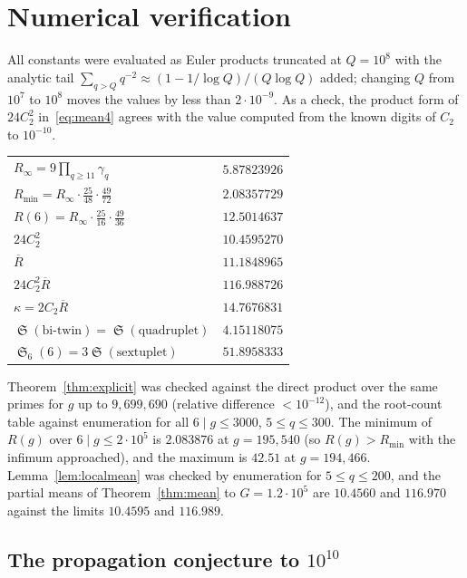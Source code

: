 \documentclass[11pt,a4paper]{article}
\theoremstyle{plain}
\theoremstyle{definition}
\theoremstyle{remark}
\newcommand{\Rbar}{\overline{R}}
\newcommand{\Rinf}{R_{\infty}}
\newcommand{\Rmin}{R_{\min}}
\DeclareMathOperator{\Sing}{\mathfrak S}
\begin{document}
\section{Numerical verification}\label{sec:data}

All constants were evaluated as Euler products truncated at
$Q=10^8$ with the analytic tail $\sum_{q>Q}q^{-2}\approx(1-1/\log Q)/(Q\log Q)$
added; changing $Q$ from $10^7$ to $10^8$ moves the values by less than
$2\cdot10^{-9}$.  As a check, the product form of $24C_2^2$ in~\eqref{eq:mean4}
agrees with the value computed from the known digits of $C_2$ to
$10^{-10}$.

\begin{center}
\begin{tabular}{@{}lr@{}}\toprule
$\Rinf=9\prod_{q\ge11}\gamma_q$ & $5.87823926$\\
$\Rmin=\Rinf\cdot\frac{25}{48}\cdot\frac{49}{72}$ & $2.08357729$\\
$R(6)=\Rinf\cdot\frac{25}{16}\cdot\frac{49}{36}$ & $12.5014637$\\
$24C_2^2$ & $10.4595270$\\
$\Rbar$ & $11.1848965$\\
$24C_2^2\Rbar$ & $116.988726$\\
$\kappa=2C_2\Rbar$ & $14.7676831$\\
$\Sing(\text{bi-twin})=\Sing(\text{quadruplet})$ & $4.15118075$\\
$\Sing_6(6)=3\Sing(\text{sextuplet})$ & $51.8958333$\\ \bottomrule
\end{tabular}
\end{center}

Theorem~\ref{thm:explicit} was checked against the direct product over
the same primes for $g$ up to $9{,}699{,}690$ (relative difference $<10^{-12}$),
and the root-count table against enumeration for all $6\mid g\le3000$,
$5\le q\le300$.  The minimum of $R(g)$ over $6\mid g\le2\cdot10^5$ is
$2.083876$ at $g=195{,}540$ (so $R(g)>\Rmin$ with the infimum approached),
and the maximum is $42.51$ at $g=194{,}466$.  Lemma~\ref{lem:localmean}
was checked by enumeration for $5\le q\le200$, and the partial means of
Theorem~\ref{thm:mean} to $G=1.2\cdot10^5$ are $10.4560$ and $116.970$
against the limits $10.4595$ and $116.989$.

\subsection*{The propagation conjecture to $10^{10}$}
\end{document}
